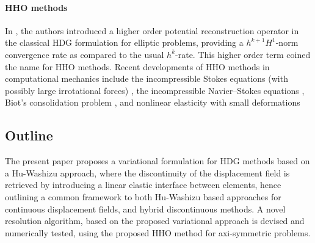 \paragraph{HHO methods}

In \cite{di_pietro_hybrid_2015, di_pietro_arbitrary-order_2014}, the authors introduced a higher order potential reconstruction operator in the classical HDG formulation for elliptic problems, providing a $h^{k+1} H^1$-norm convergence rate as compared to the usual $h^k$-rate. This higher order term coined the name for HHO methods.
Recent developments of HHO methods in
computational mechanics include the incompressible Stokes
equations (with possibly large irrotational forces) \cite{di_pietro_discontinuous_2016}, the
incompressible Navier–Stokes equations \cite{di_pietro_hybrid_2018}, Biot’s consolidation problem \cite{boffi_nonconforming_2016}, and nonlinear elasticity with small
deformations \cite{botti_hybrid_2017}

\subsection{Outline}

The present paper proposes a variational formulation for HDG methods
based on a Hu-Washizu approach, where the discontinuity of the
displacement field is retrieved by introducing a linear elastic
interface between elements, hence outlining a common framework to both
Hu-Washizu based approaches for continuous displacement fields, and
hybrid discontinuous methods. A novel resolution algorithm, based on the
proposed variational approach is devised and numerically tested, using
the proposed HHO method for axi-symmetric problems.



